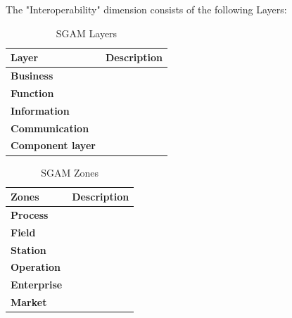 The "Interoperability" dimension consists of the following Layers:

\begin{table}[t]
    \centering
    \begin{tabular}{|p{2.8cm}|p{7cm}|} \hline
   
   
   \textbf{Layer} & \textbf{Description}  \\ \hline
  \textbf{Business} & \\ \hline
\textbf{Function}  & \\ \hline
\textbf{Information}  & \\ \hline
\textbf{Communication}  & \\ \hline
\textbf{Component layer} & \\ \hline
        
    \end{tabular}
    \caption{SGAM Layers}
    \label{tab:SGAM-Layers}
\end{table}


\begin{table}[t]
    \centering
    \begin{tabular}{|p{2.8cm}|p{7cm}|} \hline
   
   \textbf{Zones} & \textbf{Description}  \\ \hline
  \textbf{Process}   & \\ \hline
\textbf{Field}      & \\ \hline
\textbf{Station}      & \\ \hline
\textbf{Operation}     & \\ \hline
\textbf{Enterprise} & \\ \hline
\textbf{Market} & \\ \hline
        
    \end{tabular}
    \caption{SGAM Zones}
    \label{tab:SGAM-Zones}
\end{table}








